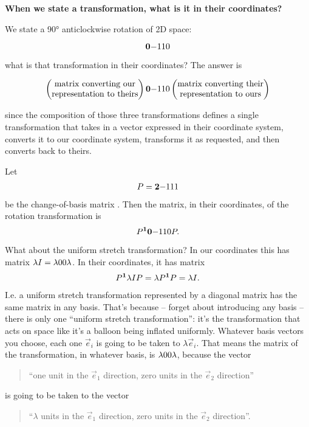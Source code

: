 \textbf{When we state a transformation, what is it in their coordinates?}

We state a 90° anticlockwise rotation of 2D space:

$$
\mathbf{0}{-1}
    {1}{0}
$$

what is that transformation in their coordinates? The answer is

$$
\begin{pmatrix}\text{matrix converting our}\\\text{representation to theirs} \\ \end{pmatrix}
\mathbf{0}{-1}
    {1}{0}
\begin{pmatrix}\text{matrix converting their}\\\text{representation to ours} \\ \end{pmatrix}
$$

since the composition of those three transformations defines a single
transformation that takes in a vector expressed in their coordinate system,
converts it to our coordinate system, transforms it as requested, and then
converts back to theirs.

Let
\begin{align*}
  P = \mathbf{2}{-1}
          {1}{1}
\end{align*}
be the change-of-basis matrix . Then the matrix, in their coordinates, of the
rotation transformation is
$$
P^{\mathbf 1}\mathbf{0}{-1}
        {1}{0} P.
$$

What about the uniform stretch transformation? In our coordinates this has
matrix $\lambda I = \mathbf{\lambda}{0}
                        {0}{\lambda}$. In their coordinates, it has matrix
\begin{align*}
P^{\mathbf 1}\lambda I P = \lambda P^{\mathbf 1} P = \lambda I.
\end{align*}
I.e. a uniform stretch transformation represented by a diagonal matrix has the
same matrix in any basis. That's because -- forget about introducing any basis
-- there is only one ``uniform stretch transformation'': it's the
transformation that acts on space like it's a balloon being inflated
uniformly. Whatever basis vectors you choose, each one $\vec e_i$ is going to be taken
to $\lambda \vec e_i$. That means the matrix of the transformation, in whatever basis,
is $\mathbf{\lambda}{0}
        {0}{\lambda}$, because the vector
\begin{quote}
``one unit in the $\vec e_1$ direction, zero units in the $\vec e_2$ direction''
\end{quote}
is going to be taken to the vector
\begin{quote}
``$\lambda$ units in the $\vec e_1$ direction, zero units in the $\vec e_2$ direction''.
\end{quote}

